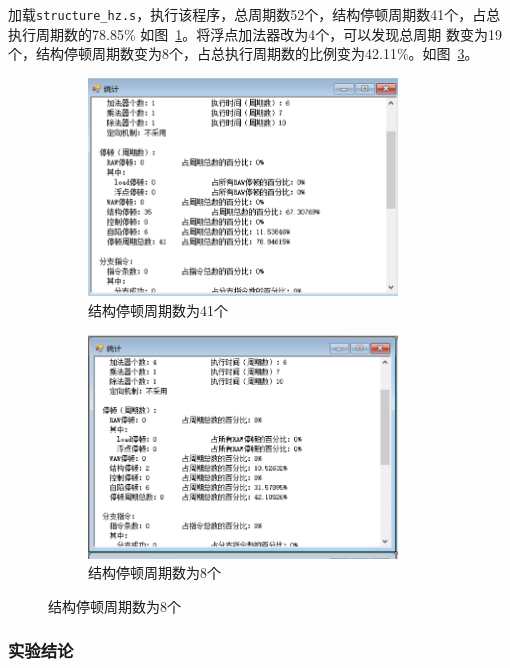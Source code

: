 \documentclass[a4paper,twoside]{article}
\begin{document}
\begin{spacing}{1.2}
加载\texttt{structure\_hz.s}，执行该程序，总周期数52个，结构停顿周期数41个，占总执行周期数的78.85\%
如图~\ref{fig:structhz}。将浮点加法器改为4个，可以发现总周期
数变为19个，结构停顿周期数变为8个，占总执行周期数的比例变为42.11\%。如图~\ref{fig:structhz4}。
\begin{figure}[htb]
	\centering
	\begin{subfigure}[b]{0.4\textwidth}
		\centering
		\includegraphics[width=0.9\textwidth]{images/structhz.png}
		\caption{结构停顿周期数为41个}
		\label{fig:structhz}
	\end{subfigure}
	\begin{subfigure}[b]{0.4\textwidth}
		\centering
		\includegraphics[width=0.9\textwidth]{images/structhz4.png}
		\caption{结构停顿周期数为8个}
		\label{fig:structhz4}
	\end{subfigure}
\end{figure}

\subsubsection{实验结论}


\end{spacing}
\end{document}
